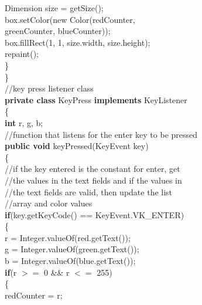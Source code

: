 \documentclass[12pt]{article}
\begin{document}
\begin{flushleft}
{\qquad \qquad \qquad \qquad	Dimension size = getSize();\\
\qquad \qquad \qquad \qquad		box.setColor(new Color(redCounter,\\
\qquad \qquad \qquad \qquad \qquad \qquad \qquad \qquad \qquad \qquad \qquad greenCounter, blueCounter));\\
\qquad \qquad \qquad \qquad		box.fillRect(1, 1, size.width, size.height);\\
\qquad \qquad \qquad \qquad		repaint();\\
\qquad \qquad \qquad	\}\\
\qquad \qquad	\}\\
		[2mm]
\qquad \qquad		//key press listener class\\
\qquad \qquad		\textbf{private class} KeyPress \textbf{implements} KeyListener\\
\qquad \qquad		\{\\
\qquad \qquad \qquad	\textbf{int} r, g, b;\\
			[2mm]
\qquad \qquad \qquad	//function that listens for the enter key to be pressed\\
\qquad \qquad \qquad	\textbf{public void} keyPressed(KeyEvent key)\\
\qquad \qquad \qquad	\{\\
\qquad \qquad \qquad \qquad		//if the key entered is the constant for enter, get\\
\qquad \qquad \qquad \qquad	 //the values in the text fields and if the values in\\
\qquad \qquad \qquad \qquad //the text fields are valid, then update the list\\
\qquad \qquad \qquad \qquad		//array and color values\\
\qquad \qquad \qquad \qquad		\textbf{if}(key.getKeyCode() == KeyEvent.VK\_ENTER)\\
 \qquad \qquad \qquad \qquad		\{\\
\qquad \qquad \qquad \qquad \qquad					r = Integer.valueOf(red.getText());\\
\qquad \qquad \qquad \qquad \qquad					g = Integer.valueOf(green.getText());\\
\qquad \qquad \qquad \qquad \qquad					b = Integer.valueOf(blue.getText());\\
					[2mm]
\qquad \qquad \qquad \qquad \qquad					\textbf{if}(r $>=$ 0 \&\& r $<=$ 255)\\
\qquad \qquad \qquad \qquad \qquad					\{\\
\qquad \qquad \qquad \qquad \qquad \qquad	redCounter = r;\\  
}
\end{flushleft}
\end{document}
